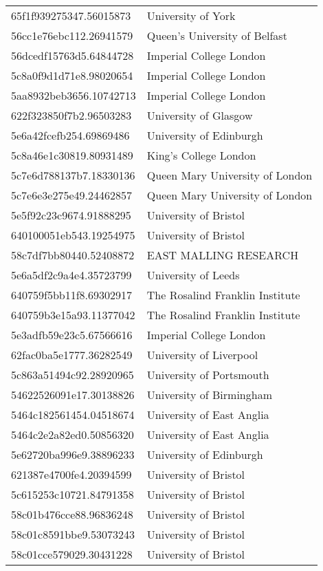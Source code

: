 \begin{tabular}{ll}
65f1f939275347.56015873 & University of York \\
56cc1e76ebc112.26941579 & Queen's University of Belfast \\
56dcedf15763d5.64844728 & Imperial College London \\
5c8a0f9d1d71e8.98020654 & Imperial College London \\
5aa8932beb3656.10742713 & Imperial College London \\
622f323850f7b2.96503283 & University of Glasgow \\
5e6a42fcefb254.69869486 & University of Edinburgh \\
5c8a46e1c30819.80931489 & King's College London \\
5c7e6d788137b7.18330136 & Queen Mary University of London \\
5c7e6e3e275e49.24462857 & Queen Mary University of London \\
5e5f92c23c9674.91888295 & University of Bristol \\
640100051eb543.19254975 & University of Bristol \\
58c7df7bb80440.52408872 & EAST MALLING RESEARCH \\
5e6a5df2c9a4e4.35723799 & University of Leeds \\
640759f5bb11f8.69302917 & The Rosalind Franklin Institute \\
640759b3e15a93.11377042 & The Rosalind Franklin Institute \\
5e3adfb59e23c5.67566616 & Imperial College London \\
62fac0ba5e1777.36282549 & University of Liverpool \\
5c863a51494c92.28920965 & University of Portsmouth \\
54622526091e17.30138826 & University of Birmingham \\
5464c182561454.04518674 & University of East Anglia \\
5464c2e2a82ed0.50856320 & University of East Anglia \\
5e62720ba996e9.38896233 & University of Edinburgh \\
621387e4700fe4.20394599 & University of Bristol \\
5c615253c10721.84791358 & University of Bristol \\
58c01b476cce88.96836248 & University of Bristol \\
58c01c8591bbe9.53073243 & University of Bristol \\
58c01cce579029.30431228 & University of Bristol \\

\end{tabular}
